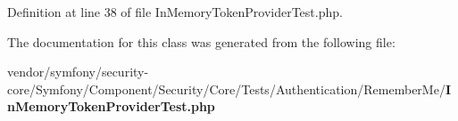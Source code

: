 Definition at line 38 of file In\+Memory\+Token\+Provider\+Test.\+php.



The documentation for this class was generated from the following file\+:\begin{DoxyCompactItemize}
\item 
vendor/symfony/security-\/core/\+Symfony/\+Component/\+Security/\+Core/\+Tests/\+Authentication/\+Remember\+Me/{\bf In\+Memory\+Token\+Provider\+Test.\+php}\end{DoxyCompactItemize}
